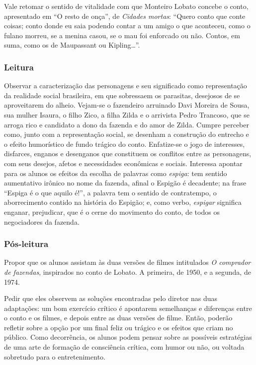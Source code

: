 \documentclass[11pt]{extarticle}
\begin{document}
Vale retomar o sentido de vitalidade com que Monteiro Lobato concebe o
conto, apresentado em ``O resto de onça'', de \emph{Cidades mortas}:
``Quero conto que conte coisas; conto donde eu saia podendo contar a um
amigo o que aconteceu, como o fulano morreu, se a menina casou, se o mau
foi enforcado ou não. Contos, em suma, como os de Maupassant ou
Kipling\ldots{}''.


\subsubsection{Leitura}

Observar a caracterização das personagens e seu significado como
representação da realidade social brasileira, em que sobressaem os
parasitas, desejosos de se aproveitarem do alheio. Vejam-se o fazendeiro
arruinado Davi Moreira de Sousa, sua mulher Isaura, o filho Zico, a
filha Zilda e o arrivista Pedro Trancoso, que se arroga rico e candidato
a dono da fazenda e do amor de Zilda. Cumpre perceber como, junto com a
representação social, se desenham a construção do entrecho e o efeito
humorístico de fundo trágico do conto. Enfatize-se o jogo de interesses,
disfarces, enganos e desenganos que constituem os conflitos entre as
personagens, com seus desejos, afetos e necessidades econômicas e
sociais. Interessa apontar para os alunos os efeitos da escolha de
palavras como \emph{espiga}: tem sentido aumentativo irônico no nome da
fazenda, afinal o Espigão é decadente; na frase ``Espiga é o que aquilo
é!'', a palavra tem o sentido de contratempo, o aborrecimento contido na
história do Espigão; e, como verbo, \emph{espigar} significa enganar,
prejudicar, que é o cerne do movimento do conto, de todos os
negociadores da fazenda.

\subsubsection{Pós-leitura}

Propor que os alunos assistam às duas versões de filmes intitulados
\emph{O comprador de fazendas}, inspirados no conto de Lobato. A
primeira, de 1950, e a segunda, de 1974.

Pedir que eles observem as soluções encontradas pelo diretor nas duas
adaptações: um bom exercício crítico é apontarem semelhanças e
diferenças entre o conto e os filmes, e depois entre as duas versões de
filme. Então, poderão refletir sobre a opção por um final feliz ou
trágico e os efeitos que criam no público. Como decorrência, os alunos
podem pensar sobre as possíveis estratégias de uma arte de formação de
consciência crítica, com humor ou não, ou voltada sobretudo para o
entretenimento.
\end{document}
